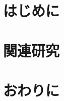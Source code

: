 
\section{はじめに}


\section{関連研究}
\label{sec:relatedwork}




\section{おわりに}
\label{sec:conclusion}

